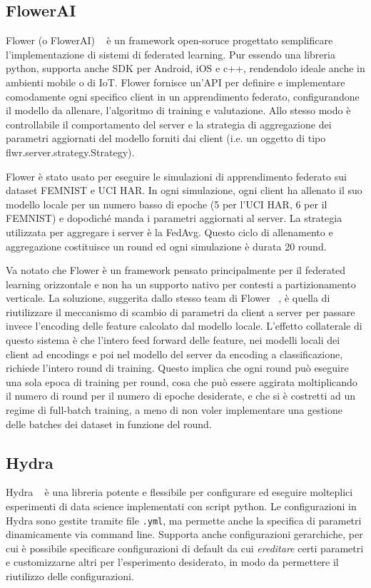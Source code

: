 \subsection{FlowerAI}
Flower (o FlowerAI) ~\cite{flowerai} è un framework open-soruce progettato semplificare
l'implementazione di sistemi di federated learning. Pur essendo una 
libreria python, supporta anche SDK per Android, iOS e c++, rendendolo 
ideale anche in ambienti mobile o di IoT.
Flower fornisce un'API per definire e implementare comodamente ogni 
specifico client in un apprendimento federato, configurandone il modello
da allenare, l'algoritmo di training e valutazione. Allo stesso modo è 
controllabile il comportamento del server e la strategia di aggregazione 
dei parametri aggiornati del modello forniti dai client  (i.e. un oggetto
di tipo flwr.server.strategy.Strategy).

Flower è stato usato per eseguire le simulazioni di apprendimento 
federato sui dataset FEMNIST e UCI HAR. In ogni simulazione, ogni client 
ha allenato il suo modello locale per un numero basso di epoche (5 per 
l'UCI HAR, 6 per il FEMNIST) e dopodiché manda i parametri aggiornati 
al server. La strategia utilizzata per aggregare i server è la
FedAvg. Questo ciclo  di allenamento e aggregazione 
costituisce un round ed ogni simulazione 
è durata 20 round.

Va notato che Flower è un framework pensato principalmente per il 
federated learning orizzontale e non ha un supporto nativo per 
contesti a partizionamento verticale. La soluzione, suggerita dallo 
stesso team di Flower ~\cite{flower_vfl}, è quella di riutilizzare 
il meccanismo di scambio di parametri da client a server per passare
invece l'encoding delle feature calcolato dal modello locale. 
L'effetto collaterale di questo sistema è che l'intero feed forward 
delle feature, nei modelli locali dei client ad encodings e poi 
nel modello del server da encoding a classificazione, richiede l'intero 
round di training. Questo implica che ogni round può eseguire una sola
epoca di training per round, cosa che può essere aggirata moltiplicando
il numero di round per il numero di epoche desiderate, e che si è
costretti ad un regime di full-batch training, a meno di non voler 
implementare una gestione delle batches dei dataset in funzione del 
round.

\subsection{Hydra}
Hydra ~\cite{hydra} è una libreria potente e flessibile per configurare 
ed eseguire molteplici esperimenti di data science implementati con 
script python. Le configurazioni in Hydra sono gestite tramite file 
\texttt{.yml}, ma permette anche la specifica di parametri dinamicamente
via command line. Supporta anche configurazioni gerarchiche, per cui 
è possibile specificare configurazioni di default da cui \textit{ereditare}
certi parametri e customizzarne altri per l'esperimento desiderato, in 
modo da permettere il riutilizzo delle configurazioni.

